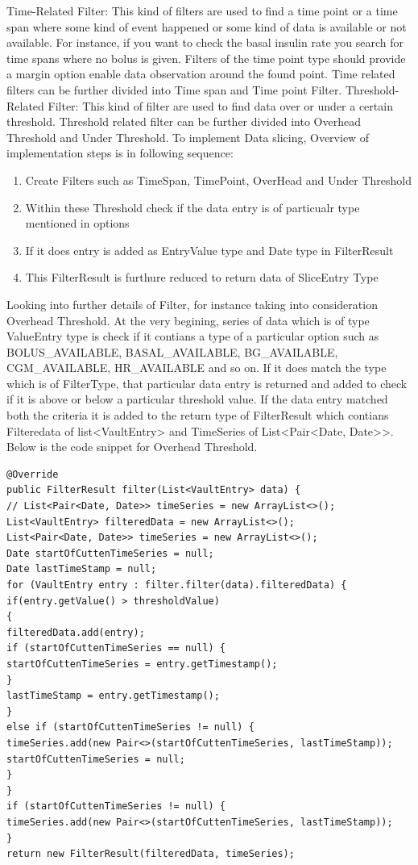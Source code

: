 \documentclass[article,type=msc,colorback,accentcolor=tud9c,twoside,11pt]{tudthesis}
\begin{document}
Time-Related Filter: This kind of filters are used to find a time point or a time span where some kind of event happened or some kind of data is available or not available. For instance, if you want to check the basal insulin rate you search for time spans where no bolus is given. Filters of the time point type should provide a margin option enable data observation around the found point. Time related filters can be further divided into Time span and Time point Filter. Threshold-Related Filter: This kind of filter are used to find data over or under a certain threshold. Threshold related filter can be further divided into Overhead Threshold and Under Threshold.
To implement Data slicing, Overview of implementation steps is in following sequence:
\begin{enumerate}
	\item Create Filters such as TimeSpan, TimePoint, OverHead and Under Threshold
	\item Within these Threshold check if the data entry is of particualr type mentioned in options 
	\item If it does entry is added as EntryValue type and Date type in FilterResult
	\item This FilterResult is furthure reduced to return data of SliceEntry Type
\end{enumerate}
Looking into further details of Filter, for instance taking into consideration Overhead Threshold. At the very begining, series of data which is of type ValueEntry type is check if it contians a type of a particular option such as BOLUS\_AVAILABLE, BASAL\_AVAILABLE, BG\_AVAILABLE, CGM\_AVAILABLE, HR\_AVAILABLE and so on. If it does match the type which is of FilterType, that particular data entry is returned and added to check if it is above or below a particular threshold value. If the data entry matched both the criteria it is added to the return type of FilterResult which contians Filteredata of list<VaultEntry> and TimeSeries of List<Pair<Date, Date>>. Below is the code snippet for Overhead Threshold.
\begin{lstlisting}
@Override
public FilterResult filter(List<VaultEntry> data) {
// List<Pair<Date, Date>> timeSeries = new ArrayList<>();
List<VaultEntry> filteredData = new ArrayList<>();
List<Pair<Date, Date>> timeSeries = new ArrayList<>();
Date startOfCuttenTimeSeries = null;
Date lastTimeStamp = null;
for (VaultEntry entry : filter.filter(data).filteredData) {
if(entry.getValue() > thresholdValue)
{               
filteredData.add(entry);
if (startOfCuttenTimeSeries == null) {
startOfCuttenTimeSeries = entry.getTimestamp();
}
lastTimeStamp = entry.getTimestamp();
}
else if (startOfCuttenTimeSeries != null) {
timeSeries.add(new Pair<>(startOfCuttenTimeSeries, lastTimeStamp));
startOfCuttenTimeSeries = null;
}
}
if (startOfCuttenTimeSeries != null) {
timeSeries.add(new Pair<>(startOfCuttenTimeSeries, lastTimeStamp));
}
return new FilterResult(filteredData, timeSeries); 
\end{lstlisting}
\end{document}
